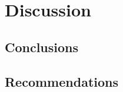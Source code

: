 \chapter{Discussion}

%	
%	


	
\section{Conclusions}


\section{Recommendations} \label{sec:recommendations}


